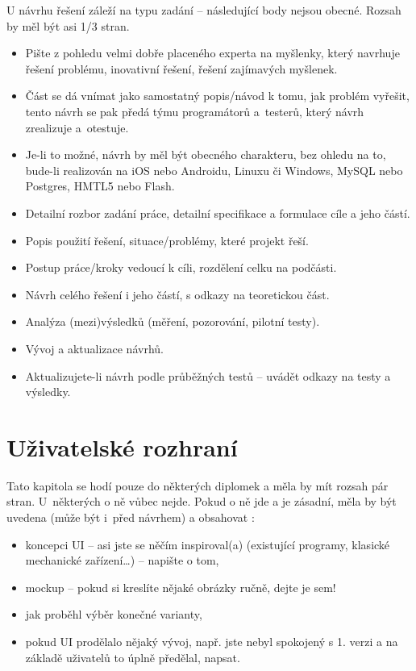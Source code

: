 U návrhu řešení záleží na typu zadání -- následující body nejsou obecné. Rozsah by měl být asi 1/3 stran.
\begin{itemize}
  \item{Pište z pohledu velmi dobře placeného experta na myšlenky, který navrhuje řešení problému, inovativní řešení, řešení zajímavých myšlenek.}
  \item{Část  se dá vnímat jako samostatný popis/návod k tomu, jak problém vyřešit, tento návrh se pak předá týmu programátorů a~testerů, který návrh zrealizuje a~otestuje.}
  \item{Je-li to možné, návrh by měl být obecného charakteru, bez ohledu na to, bude-li realizován na iOS nebo Androidu, Linuxu či Windows, MySQL nebo Postgres, HMTL5 nebo Flash.}
  \item{Detailní rozbor zadání práce, detailní specifikace a formulace cíle a jeho částí.}
  \item{Popis použití řešení, situace/problémy, které projekt řeší.}
  \item{Postup práce/kroky vedoucí k cíli, rozdělení celku na podčásti.}
  \item{Návrh celého řešení i jeho částí, s odkazy na teoretickou část.}
  \item{Analýza (mezi)výsledků (měření, pozorování, pilotní testy).}
  \item{Vývoj a aktualizace návrhů.}
  \item{Aktualizujete-li návrh podle průběžných testů -- uvádět odkazy na testy a výsledky.}
\end{itemize}

\section{Uživatelské rozhraní}

Tato kapitola se hodí pouze do některých diplomek a měla by mít rozsah pár stran. U~některých o ně vůbec nejde. Pokud o ně jde a je zásadní, měla by být uvedena (může být i~před návrhem) a obsahovat \cite{Cernocky}:
\begin{itemize}
  \item{koncepci UI -- asi jste se něčím inspiroval(a) (existující programy, klasické mechanické zařízení\ldots) -- napište o tom,}
  \item{mockup -- pokud si kreslíte nějaké obrázky ručně, dejte je sem!}
  \item{jak proběhl výběr konečné varianty,}
  \item{pokud UI prodělalo nějaký vývoj, např. jste nebyl spokojený s 1. verzi a na základě uživatelů to úplně předělal, napsat.}
\end{itemize}


